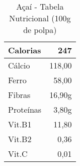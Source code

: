 \begin{table}[ht]
\begin{center}
\begin{tabular}{|l|r|}
\hline Calorias & 247\\
\hline Cálcio & 118,00\\
\hline Ferro & 58,00\\
\hline Fibras & 16,90g\\
\hline Proteínas & 3,80g\\
\hline Vit.B1 & 11,80\\
\hline Vit.B2 & 0,36\\
\hline Vit.C & 0,01\\
\hline
\end{tabular}
\end{center}
\caption{Açaí - Tabela Nutricional (100g de polpa)}\label{tab_exe}
\end{table}

